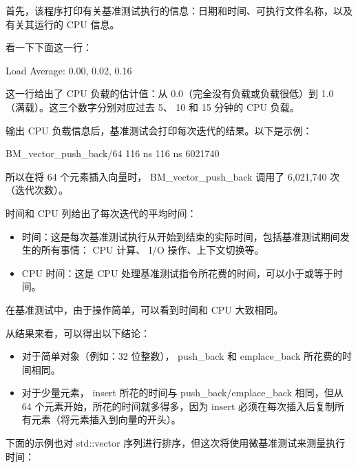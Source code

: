 首先，该程序打印有关基准测试执行的信息：日期和时间、可执行文件名称，以及有关其运行的 CPU 信息。

看一下下面这一行：

\begin{shell}
Load Average: 0.00, 0.02, 0.16
\end{shell}

这一行给出了 CPU 负载的估计值：从 0.0（完全没有负载或负载很低）到 1.0（满载）。这三个数字分别对应过去 5、 10 和 15 分钟的 CPU 负载。

输出 CPU 负载信息后，基准测试会打印每次迭代的结果。以下是示例：

\begin{shell}
BM_vector_push_back/64     116 ns         116 ns      6021740
\end{shell}

所以在将 64 个元素插入向量时， BM\_vector\_push\_back 调用了 6,021,740 次（迭代次数）。

时间和 CPU 列给出了每次迭代的平均时间：

\begin{itemize}
\item
时间：这是每次基准测试执行从开始到结束的实际时间，包括基准测试期间发生的所有事情： CPU 计算、 I/O 操作、上下文切换等。

\item
CPU 时间：这是 CPU 处理基准测试指令所花费的时间，可以小于或等于时间。
\end{itemize}

在基准测试中，由于操作简单，可以看到时间和 CPU 大致相同。

从结果来看，可以得出以下结论：

\begin{itemize}
\item
对于简单对象（例如：32 位整数）， push\_back 和 emplace\_back 所花费的时间相同。

\item
对于少量元素， insert 所花的时间与 push\_back/emplace\_back 相同，但从 64 个元素开始，所花的时间就多得多，因为 insert 必须在每次插入后复制所有元素（将元素插入到向量的开头）。
\end{itemize}

下面的示例也对 std::vector 序列进行排序，但这次将使用微基准测试来测量执行时间：

